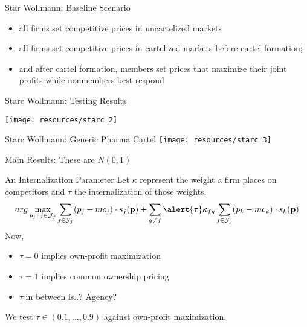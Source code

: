\begin{frame}{Star Wollmann: Baseline Scenario }
\begin{itemize}
\item all firms set competitive prices in uncartelized markets
\item all firms set competitive prices in cartelized markets before cartel formation;
\item  and after cartel formation, members set prices that maximize their joint profits while nonmembers best respond
\end{itemize}
\end{frame}

\begin{frame}{Starc Wollmann: Testing Results }
\begin{center}
\texttt{[image: resources/starc\_2]}
\end{center}
\end{frame}

\begin{frame}{Starc Wollmann: Generic Pharma Cartel }
\texttt{[image: resources/starc\_3]}
\end{frame}



\begin{frame}[plain,label=mainresults]{Main Results: These are $N(0,1)$}
\begin{center}
\scalebox{0.55}{}
\end{center}
\end{frame}

\begin{frame}[plain]{An Internalization Parameter}
Let $\kappa$ represent the weight a firm places on competitors and $\tau$ the internalization of those weights.
 \begin{equation*}
 arg\max_{p_j \,:\, j \in \mathcal{J}_f} \sum_{j \in \mathcal{J}_f} (p_j - mc_j) \cdot s_j(\mathbf{p})+
 \sum_{g\neq f} \alert{\tau} \kappa_{fg} \sum_{j \in \mathcal{J}_g} (p_k - mc_k) \cdot s_k(\mathbf{p})
 \end{equation*}
Now, 
\begin{itemize}
\item $\tau = 0$ implies own-profit maximization
\item $\tau = 1$ implies common ownership pricing
\item $\tau$ in between is..? Agency?
\end{itemize}
We test $\tau \in (0.1, \ldots, 0.9)$ against own-profit maximization.
\end{frame}

